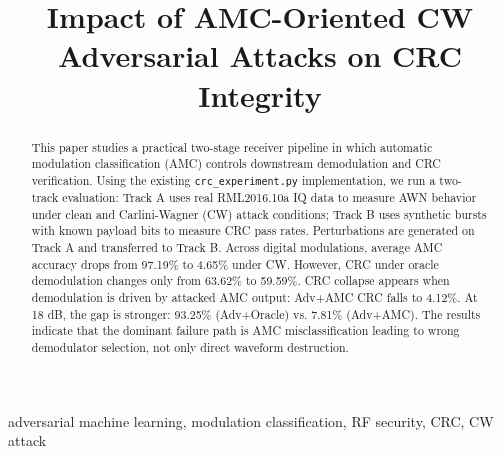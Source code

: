 \documentclass[conference]{IEEEtran}
\title{Impact of AMC-Oriented CW Adversarial Attacks on CRC Integrity}
\author{
\IEEEauthorblockN{Anonymous Authors}
\IEEEauthorblockA{
Affiliation Withheld for Review \\
Email: anonymous@anonymous.org
}
}
\begin{document}
\maketitle

\begin{abstract}
This paper studies a practical two-stage receiver pipeline in which automatic modulation
classification (AMC) controls downstream demodulation and CRC verification. Using the existing
\texttt{crc\_experiment.py} implementation, we run a two-track evaluation: Track A uses real
RML2016.10a IQ data to measure AWN behavior under clean and Carlini-Wagner (CW) attack
conditions; Track B uses synthetic bursts with known payload bits to measure CRC pass rates.
Perturbations are generated on Track A and transferred to Track B. Across digital modulations,
average AMC accuracy drops from 97.19\% to 4.65\% under CW. However, CRC under oracle
demodulation changes only from 63.62\% to 59.59\%. CRC collapse appears when demodulation is
driven by attacked AMC output: Adv+AMC CRC falls to 4.12\%. At 18 dB, the gap is stronger:
93.25\% (Adv+Oracle) vs. 7.81\% (Adv+AMC). The results indicate that the dominant failure path
is AMC misclassification leading to wrong demodulator selection, not only direct waveform
destruction.
\end{abstract}

\begin{IEEEkeywords}
adversarial machine learning, modulation classification, RF security, CRC, CW attack
\end{IEEEkeywords}




\end{document}
